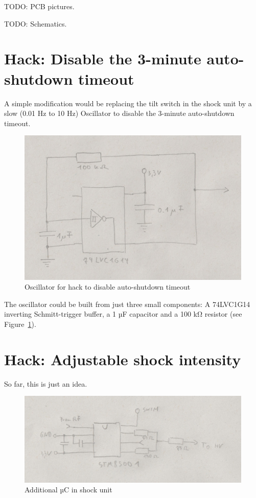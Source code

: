 \documentclass[a4paper]{article}
\begin{document}
TODO: PCB pictures.

TODO: Schematics.

\section{Hack: Disable the 3-minute auto-shutdown timeout}

A simple modification would be replacing the tilt switch in the shock unit by a slow (0.01 Hz to 10 Hz) Oscillator to disable the 3-minute auto-shutdown timeout.

\begin{figure}
	\centerline{\includegraphics[scale=0.5]{auto-shutdown-timeout-hack.jpeg}}
	\caption{\label{auto-shutdown-timeout-hack}Oscillator for hack to disable auto-shutdown timeout}
\end{figure}

The oscillator could be built from just three small components: A 74LVC1G14 inverting Schmitt-trigger buffer, a 1 µF capacitor and a 100 k\si{\ohm} resistor (see Figure~\ref{auto-shutdown-timeout-hack}).

\section{Hack: Adjustable shock intensity}

So far, this is just an idea.

\begin{figure}
	\centerline{\includegraphics[scale=0.5]{level-hack-shock-unit.jpeg}}
	\caption{\label{level-hack-shock-unit}Additional µC in shock unit}
\end{figure}
\end{document}

